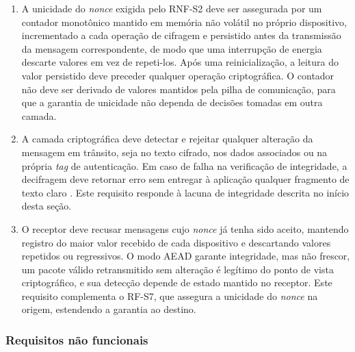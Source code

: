 \begin{enumerate}
    \item[RF-S7.] A unicidade do \textit{nonce} exigida pelo RNF-S2 deve ser assegurada por um contador monotônico mantido em memória não volátil no próprio dispositivo, incrementado a cada operação de cifragem e persistido antes da transmissão da mensagem correspondente, de modo que uma interrupção de energia descarte valores em vez de repeti-los. Após uma reinicialização, a leitura do valor persistido deve preceder qualquer operação criptográfica. O contador não deve ser derivado de valores mantidos pela pilha de comunicação, para que a garantia de unicidade não dependa de decisões tomadas em outra camada.

    \item[RF-S8.] A camada criptográfica deve detectar e rejeitar qualquer alteração da mensagem em trânsito, seja no texto cifrado, nos dados associados ou na própria \textit{tag} de autenticação. Em caso de falha na verificação de integridade, a decifragem deve retornar erro sem entregar à aplicação qualquer fragmento de texto claro \cite{nist800232}. Este requisito responde à lacuna de integridade descrita no início desta seção.

    \item[RF-S9.] O receptor deve recusar mensagens cujo \textit{nonce} já tenha sido aceito, mantendo registro do maior valor recebido de cada dispositivo e descartando valores repetidos ou regressivos. O modo AEAD garante integridade, mas não frescor, um pacote válido retransmitido sem alteração é legítimo do ponto de vista criptográfico, e sua detecção depende de estado mantido no receptor. Este requisito complementa o RF-S7, que assegura a unicidade do \textit{nonce} na origem, estendendo a garantia ao destino.
\end{enumerate}

\subsubsection{Requisitos não funcionais}

